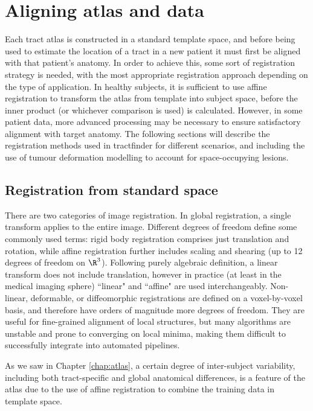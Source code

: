 \chapter{Aligning atlas and data}
\label{chap:reg}

Each tract atlas is constructed in a standard template space, and before being used to estimate the location of a tract in a new patient it must first be aligned with that patient's anatomy.
In order to achieve this, some sort of registration strategy is needed, with the most appropriate registration approach depending on the type of application.
In healthy subjects, it is sufficient to use affine registration to transform the atlas from template into subject space, before the inner product (or whichever comparison is used) is calculated.
However, in some patient data, more advanced processing may be necessary to ensure satisfactory alignment with target anatomy.
The following sections will describe the registration methods used in tractfinder for different scenarios, and including the use of tumour deformation modelling to account for space-occupying lesions.

\section{Registration from standard space}

There are two categories of image registration.
In global registration, a single transform applies to the entire image.
Different degrees of freedom define some commonly used terms: rigid body registration comprises just translation and rotation, while affine registration further includes scaling and shearing (up to 12 degrees of freedom on $\R^3$).
Following purely algebraic definition, a linear transform does not include translation, however in practice (at least in the medical imaging sphere) ``linear" and ``affine" are used interchangeably.
Non-linear, deformable, or diffeomorphic registrations are defined on a voxel-by-voxel basis, and therefore have orders of magnitude more degrees of freedom.
They are useful for fine-grained alignment of local structures, but many algorithms are unstable and prone to converging on local minima, making them difficult to successfully integrate into automated pipelines.

As we saw in Chapter \ref{chap:atlas}, a certain degree of inter-subject variability, including both tract-specific and global anatomical differences, is a feature of the atlas due to the use of affine registration to combine the training data in template space.


